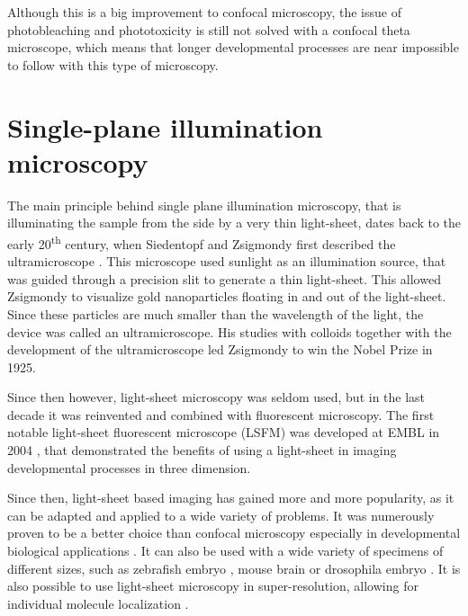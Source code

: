 \documentclass{tdk_style}
\begin{document}
Although this is a big improvement to confocal microscopy, the issue of photobleaching and phototoxicity is still not solved with a confocal theta microscope, which means that longer developmental processes are near impossible to follow with this type of microscopy.




\chapter{Single-plane illumination microscopy}
\label{chap2}

The main principle behind single plane illumination microscopy, that is illuminating the sample from the side by a very thin light-sheet, dates back to the early 20\textsuperscript{th} century, when Siedentopf and Zsigmondy first described the ultramicroscope \cite{siedentopf_uber_1902}. This microscope used sunlight as an illumination source, that was guided through a precision slit to generate a thin light-sheet. This allowed Zsigmondy to visualize gold nanoparticles floating in and out of the light-sheet. Since these particles are much smaller than the wavelength of the light, the device was called an ultramicroscope. His studies with colloids together with the development of the ultramicroscope led Zsigmondy to win the Nobel Prize in 1925.

Since then however, light-sheet microscopy was seldom used, but in the last decade it was reinvented and combined with fluorescent microscopy. The first notable light-sheet fluorescent microscope (LSFM) was developed at EMBL in 2004 \cite{huisken_optical_2004}, that demonstrated the benefits of using a light-sheet in imaging developmental processes in three dimension.

Since then, light-sheet based imaging has gained more and more popularity, as it can be adapted and applied to a wide variety of problems. It was numerously proven to be a better choice than confocal microscopy \cite{reynaud_light_2008,huisken_selective_2009} especially in developmental biological applications \cite{weber_light_2011}. It can also be used with a wide variety of specimens of different sizes, such as zebrafish embryo \cite{keller_reconstruction_2008}, mouse brain \cite{dodt_ultramicroscopy:_2007} or drosophila embryo \cite{krzic_multiview_2012}. It is also possible to use light-sheet microscopy in super-resolution, allowing for individual molecule localization \cite{zanacchi_live-cell_2011}.
	
\end{document}
